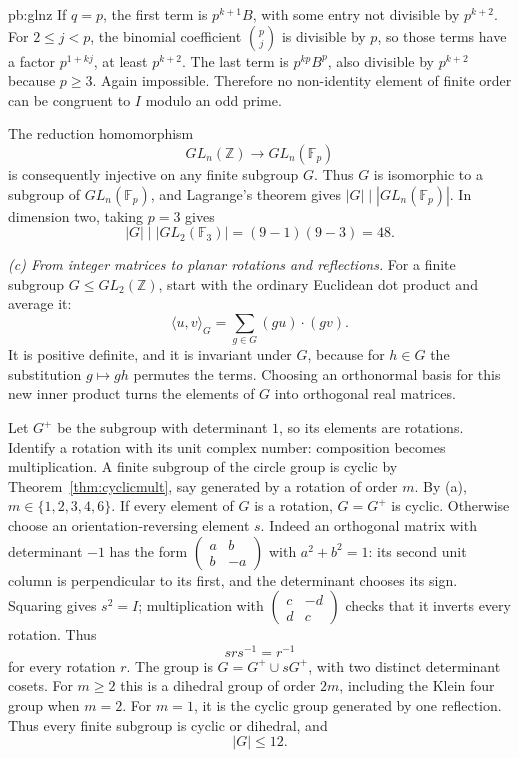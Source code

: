 \begin{solution}{pb:glnz}
If $q=p$, the first term is $p^{k+1}B$, with some entry not divisible by $p^{k+2}$. For $2\le j<p$, the binomial coefficient $\binom pj$ is divisible by $p$, so those terms have a factor $p^{1+kj}$, at least $p^{k+2}$. The last term is $p^{kp}B^p$, also divisible by $p^{k+2}$ because $p\ge3$. Again impossible. Therefore no non-identity element of finite order can be congruent to $I$ modulo an odd prime.

The reduction homomorphism
\[
GL_n(\mathbb Z)\longrightarrow GL_n(\mathbb F_p)
\]
is consequently injective on any finite subgroup $G$. Thus $G$ is isomorphic to a subgroup of $GL_n(\mathbb F_p)$, and Lagrange's theorem gives $|G|\mid|GL_n(\mathbb F_p)|$. In dimension two, taking $p=3$ gives
\[
\boxed{|G|\mid |GL_2(\mathbb F_3)|=(9-1)(9-3)=48}.
\]

\emph{(c) From integer matrices to planar rotations and reflections.}
For a finite subgroup $G\le GL_2(\mathbb Z)$, start with the ordinary Euclidean dot product and average it:
\[
\langle u,v\rangle_G=\sum_{g\in G}(gu)\cdot(gv).
\]
It is positive definite, and it is invariant under $G$, because for $h\in G$ the substitution $g\mapsto gh$ permutes the terms. Choosing an orthonormal basis for this new inner product turns the elements of $G$ into orthogonal real matrices.

Let $G^+$ be the subgroup with determinant $1$, so its elements are rotations. Identify a rotation with its unit complex number: composition becomes multiplication. A finite subgroup of the circle group is cyclic by Theorem~\ref{thm:cyclicmult}, say generated by a rotation of order $m$. By (a), $m\in\{1,2,3,4,6\}$. If every element of $G$ is a rotation, $G=G^+$ is cyclic. Otherwise choose an orientation-reversing element $s$. Indeed an orthogonal matrix with determinant $-1$ has the form $\begin{pmatrix}a&b\\b&-a\end{pmatrix}$ with $a^2+b^2=1$: its second unit column is perpendicular to its first, and the determinant chooses its sign. Squaring gives $s^2=I$; multiplication with $\begin{pmatrix}c&-d\\d&c\end{pmatrix}$ checks that it inverts every rotation. Thus
\[
srs^{-1}=r^{-1}
\]
for every rotation $r$. The group is $G=G^+\cup sG^+$, with two distinct determinant cosets. For $m\ge2$ this is a dihedral group of order $2m$, including the Klein four group when $m=2$. For $m=1$, it is the cyclic group generated by one reflection. Thus every finite subgroup is cyclic or dihedral, and
\[
\boxed{|G|\le12}.
\]


\end{solution}
